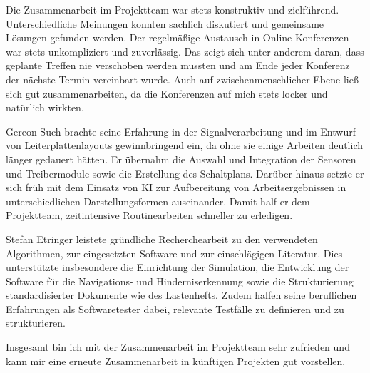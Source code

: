 Die Zusammenarbeit im Projektteam war stets konstruktiv und zielführend. Unterschiedliche Meinungen konnten sachlich diskutiert und gemeinsame Lösungen gefunden werden. Der regelmäßige Austausch in Online-Konferenzen war stets unkompliziert und zuverlässig. Das zeigt sich unter anderem daran, dass geplante Treffen nie verschoben werden mussten und am Ende jeder Konferenz der nächste Termin vereinbart wurde. Auch auf zwischenmenschlicher Ebene ließ sich gut zusammenarbeiten, da die Konferenzen auf mich stets locker und natürlich wirkten.

Gereon Such brachte seine Erfahrung in der Signalverarbeitung und im Entwurf von Leiterplattenlayouts gewinnbringend ein, da ohne sie einige Arbeiten deutlich länger gedauert hätten. Er übernahm die Auswahl und Integration der Sensoren und Treibermodule sowie die Erstellung des Schaltplans. Darüber hinaus setzte er sich früh mit dem Einsatz von KI zur Aufbereitung von Arbeitsergebnissen in unterschiedlichen Darstellungsformen auseinander. Damit half er dem Projektteam, zeitintensive Routinearbeiten schneller zu erledigen.

Stefan Etringer leistete gründliche Recherchearbeit zu den verwendeten Algorithmen, zur eingesetzten Software und zur einschlägigen Literatur. Dies unterstützte insbesondere die Einrichtung der Simulation, die Entwicklung der Software für die Navigations- und Hinderniserkennung sowie die Strukturierung standardisierter Dokumente wie des Lastenhefts. Zudem halfen seine beruflichen Erfahrungen als Softwaretester dabei, relevante Testfälle zu definieren und zu strukturieren.

Insgesamt bin ich mit der Zusammenarbeit im Projektteam sehr zufrieden und kann mir eine erneute Zusammenarbeit in künftigen Projekten gut vorstellen.